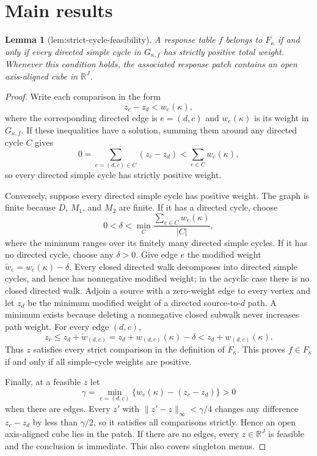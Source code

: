 \documentclass{article}
\newtheorem{lemma}{Lemma}
\begin{document}
\section{Main results}

\begin{lemma}[lem:strict-cycle-feasibility]\label{lem:strict-cycle-feasibility}
A response table \(f\) belongs to \(F_\kappa\) if and only if every directed simple cycle in \(G_{\kappa,f}\) has strictly positive total weight. Whenever this condition holds, the associated response patch contains an open axis-aligned cube in \(\mathbb R^J\).
\end{lemma}
\begin{proof}
Write each comparison in the form
\[
 z_c-z_d<w_e(\kappa),
\]
where the corresponding directed edge is \(e=(d,c)\) and \(w_e(\kappa)\) is its weight in \(G_{\kappa,f}\).  If these inequalities have a solution, summing them around any directed cycle \(C\) gives
\[
 0=\sum_{e=(d,c)\in C}(z_c-z_d)<\sum_{e\in C}w_e(\kappa),
\]
so every directed simple cycle has strictly positive weight.

Conversely, suppose every directed simple cycle has positive weight.  The graph is finite because \(D\), \(M_1\), and \(M_2\) are finite.  If it has a directed cycle, choose
\[
 0<\delta<\min_C\frac{\sum_{e\in C}w_e(\kappa)}{|C|},
\]
where the minimum ranges over its finitely many directed simple cycles.  If it has no directed cycle, choose any \(\delta>0\).  Give edge \(e\) the modified weight \(\widetilde w_e=w_e(\kappa)-\delta\).  Every closed directed walk decomposes into directed simple cycles, and hence has nonnegative modified weight; in the acyclic case there is no closed directed walk.  Adjoin a source with a zero-weight edge to every vertex and let \(z_d\) be the minimum modified weight of a directed source-to-\(d\) path.  A minimum exists because deleting a nonnegative closed subwalk never increases path weight.  For every edge \((d,c)\),
\[
 z_c\le z_d+\widetilde w_{(d,c)}=z_d+w_{(d,c)}(\kappa)-\delta<z_d+w_{(d,c)}(\kappa).
\]
Thus \(z\) satisfies every strict comparison in the definition of \(F_\kappa\).  This proves \(f\in F_\kappa\) if and only if all simple-cycle weights are positive.

Finally, at a feasible \(z\) let
\[
 \gamma=\min_{e=(d,c)}\{w_e(\kappa)-(z_c-z_d)\}>0
\]
when there are edges.  Every \(z'\) with \(\|z'-z\|_\infty<\gamma/4\) changes any difference \(z_c-z_d\) by less than \(\gamma/2\), so it satisfies all comparisons strictly.  Hence an open axis-aligned cube lies in the patch.  If there are no edges, every \(z\in\mathbb R^J\) is feasible and the conclusion is immediate.  This also covers singleton menus.
\end{proof}
\end{document}

